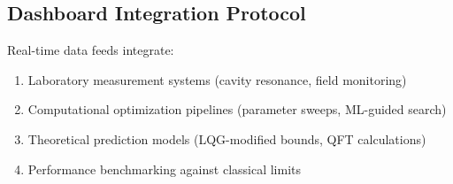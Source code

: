 \documentclass[11pt]{article}
\begin{document}
\subsection*{Dashboard Integration Protocol}
Real-time data feeds integrate:
\begin{enumerate}
  \item Laboratory measurement systems (cavity resonance, field monitoring)
  \item Computational optimization pipelines (parameter sweeps, ML-guided search)
  \item Theoretical prediction models (LQG-modified bounds, QFT calculations)
  \item Performance benchmarking against classical limits
\end{enumerate}
\end{document}
